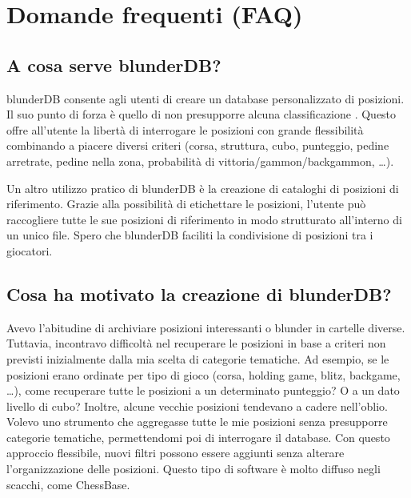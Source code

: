 \documentclass[letterpaper,10pt,italian]{sphinxmanual}
\begin{document}
\sphinxstepscope


\section{Domande frequenti (FAQ)}
\label{\detokenize{faq:foire-aux-questions}}\label{\detokenize{faq:faq}}\label{\detokenize{faq::doc}}

\subsection{A cosa serve blunderDB?}
\label{\detokenize{faq:quel-est-l-utilite-de-blunderdb}}
\sphinxAtStartPar
blunderDB consente agli utenti di creare un database personalizzato di posizioni. Il suo punto di forza è quello di non presupporre alcuna classificazione . Questo offre all’utente la libertà di interrogare le posizioni con grande flessibilità combinando a piacere diversi criteri (corsa, struttura, cubo, punteggio, pedine arretrate, pedine nella zona, probabilità di vittoria/gammon/backgammon, …).

\sphinxAtStartPar
Un altro utilizzo pratico di blunderDB è la creazione di cataloghi di posizioni di riferimento. Grazie alla possibilità di etichettare le posizioni, l’utente può raccogliere tutte le sue posizioni di riferimento in modo strutturato all’interno di un unico file. Spero che blunderDB faciliti la condivisione di posizioni tra i giocatori.


\subsection{Cosa ha motivato la creazione di blunderDB?}
\label{\detokenize{faq:qu-est-ce-qui-a-motive-la-creation-de-blunderdb}}
\sphinxAtStartPar
Avevo l’abitudine di archiviare posizioni interessanti o blunder in cartelle diverse. Tuttavia, incontravo difficoltà nel recuperare le posizioni in base a criteri non previsti inizialmente dalla mia scelta di categorie tematiche. Ad esempio, se le posizioni erano ordinate per tipo di gioco (corsa, holding game, blitz, backgame, …), come recuperare tutte le posizioni a un determinato punteggio? O a un dato livello di cubo? Inoltre, alcune vecchie posizioni tendevano a cadere nell’oblio. Volevo uno strumento che aggregasse tutte le mie posizioni senza presupporre  categorie tematiche, permettendomi poi di interrogare il database. Con questo approccio flessibile, nuovi filtri possono essere aggiunti senza alterare l’organizzazione delle posizioni. Questo tipo di software è molto diffuso negli scacchi, come ChessBase.
\end{document}
